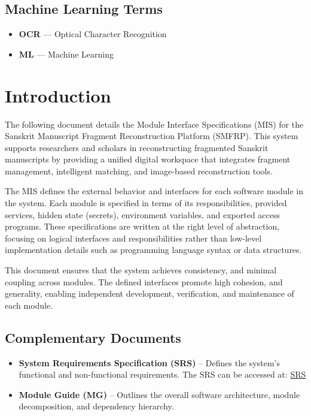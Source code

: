 \documentclass[12pt, titlepage]{article}
\begin{document}
\subsection*{Machine Learning Terms}
\begin{itemize}
    \item \textbf{OCR} — Optical Character Recognition
    \item \textbf{ML} — Machine Learning
\end{itemize}

\newpage

\tableofcontents

\newpage

\listoftables

\newpage


\section{Introduction}

The following document details the Module Interface Specifications (MIS) for the Sanskrit Manuscript Fragment Reconstruction Platform (SMFRP). This system supports researchers and scholars in reconstructing fragmented Sanskrit manuscripts by providing a unified digital workspace that integrates fragment management, intelligent matching, and image-based reconstruction tools.

The MIS defines the external behavior and interfaces for each software module in the system. Each module is specified in terms of its responsibilities, provided services, hidden state (secrets), environment variables, and exported access programs. These specifications are written at the right level of abstraction, focusing on logical interfaces and responsibilities rather than low-level implementation details such as programming language syntax or data structures.

This document ensures that the system achieves consistency, and minimal coupling across modules. The defined interfaces promote high cohesion, and generality, enabling independent development, verification, and maintenance of each module.

\subsection*{Complementary Documents}
\begin{itemize}
    \item \textbf{System Requirements Specification (SRS)} – Defines the system’s functional and non-functional requirements. The SRS \citep{SRS-Sanskrit-Ciphers} can be accessed at: \href{https://github.com/DylanG5/sanskrit-ciphers-requirements/tree/ab899d5d07b554c8e80fb4fc8a8adaa181a0c81a}{SRS}
    \item \textbf{Module Guide (MG)} – Outlines the overall software architecture, module decomposition, and dependency hierarchy.
\end{itemize}
\end{document}
